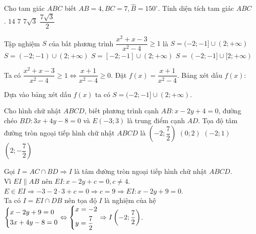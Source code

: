 \begin{ex}%
Cho tam giác $ABC$ biết $AB=4, BC=7, \widehat{B}=150^{\circ}$. Tính diện tích tam giác $ABC$.
	\choice
	{$14$}
	{\True $7$}
	{$7\sqrt{3}$}
	{$\dfrac{7\sqrt{3}}{2}$}
\end{ex}


\begin{ex}%
Tập nghiệm $S$ của bất phương trình $\dfrac{x^2+x-3}{x^2-4}\geq 1$ là
\choice
{\True $S=(-2; -1]\cup (2; +\infty)$}
{$S=(-2; -1)\cup (2; +\infty)$}
{$S=[-2; -1]\cup (2; +\infty)$}
{$S=(-2; -1]\cup [2; +\infty)$}
\loigiai
{Ta có $\dfrac{x^2+x-3}{x^2-4}\geq 1\Leftrightarrow \dfrac{x+1}{x^2-4}\geq 0$. Đặt $f(x)=\dfrac{x+1}{x^2-4}$. Bảng xét dấu $f(x)$:
\begin{center}
\end{center}
Dựa vào bảng xét dấu $f(x)$ ta có $S=(-2; -1]\cup (2; +\infty)$.
}
\end{ex}


\begin{ex}%
Cho hình chữ nhật $ABCD$, biết phương trình cạnh $AB: x-2y+4=0$, đường chéo $BD: 3x+4y-8=0$ và $E(-3; 3)$ là trung điểm cạnh $AD$.
Tọa độ tâm đường tròn ngoại tiếp hình chữ nhật $ABCD$ là
\choice
{\True $\left(-2; \dfrac{7}{2}\right)$}
{$(0; 2)$}
{$(-2; 1)$}
{$\left(2; -\dfrac{7}{2}\right)$}
\loigiai
{\immini
{Gọi $I=AC\cap BD \Rightarrow I$ là tâm đường tròn ngoại tiếp hình chữ nhật $ABCD$.\\
Vì $EI\parallel AB$ nên $EI: x-2y+c=0, c\neq 4$.\\
$E\in EI\Rightarrow -3-2\cdot 3+c=0\Rightarrow c=9\Rightarrow EI: x-2y+9=0$.\\
Ta có $I=EI\cap DB$ nên tọa độ $I$ là nghiệm của hệ\\
$\left\{\begin{aligned}&x-2y+9=0\\&3x+4y-8=0\end{aligned}\right.\Leftrightarrow\left\{\begin{aligned}&x=-2\\&y=\dfrac{7}{2}\end{aligned}\right.\Rightarrow I\left(-2; \dfrac{7}{2}\right)$.
}
{}
}
\end{ex}

